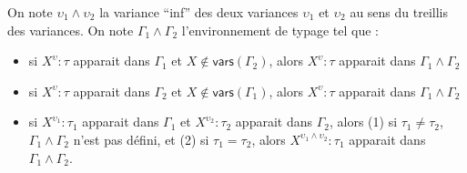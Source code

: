 \documentclass[11pt,a4paper]{article}
\newcommand{\avariance}{\upsilon}
\begin{document}
On note $\avariance_1\wedge\avariance_2$ la variance ``inf'' des deux variances $\avariance_1$ et $\avariance_2$ au sens du
treillis des variances. On note $\Gamma_1\wedge\Gamma_2$ l'environnement de typage tel que :
\begin{itemize}
\item si $X^{\avariance}:\tau$
apparait dans $\Gamma_1$ et $X\not\in\mathsf{vars}(\Gamma_2)$, alors $X^{\avariance}:\tau$ apparait dans $\Gamma_1\wedge\Gamma_2$
\item si $X^{\avariance}:\tau$
apparait dans $\Gamma_2$ et $X\not\in\mathsf{vars}(\Gamma_1)$, alors $X^{\avariance}:\tau$ apparait dans $\Gamma_1\wedge\Gamma_2$
\item si $X^{\avariance_1}:\tau_1$ apparait dans $\Gamma_1$ et $X^{\avariance_2}:\tau_2$ apparait dans $\Gamma_2$,
alors (1) si $\tau_1\neq\tau_2$, $\Gamma_1\wedge\Gamma_2$ n'est pas défini, et (2) si $\tau_1=\tau_2$, alors
$X^{\avariance_1\wedge\avariance_2}:\tau_1$ apparait dans $\Gamma_1\wedge\Gamma_2$.
\end{itemize}
\end{document}

